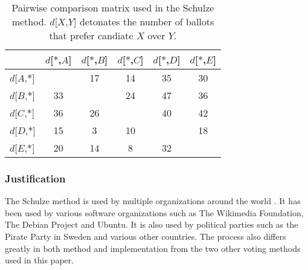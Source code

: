 \documentclass[12pt]{article}
\begin{document}
\begin{table}
\centering
\caption{Pairwise comparison matrix used in the Schulze method. $d$[$X$,$Y$] detonates the number of ballots that prefer candiate $X$ over $Y$.}
\begin{tabular}{l|c|c|c|c|c|}
\cline{2-6}
 & \multicolumn{1}{l|}{\small $d$[$*$,$A$]} & \multicolumn{1}{l|}{\small $d$[$*$,$B$]} & \multicolumn{1}{l|}{\small $d$[$*$,$C$]} & \multicolumn{1}{l|}{\small $d$[$*$,$D$]} & \multicolumn{1}{l|}{\small $d$[$*$,$E$]} \\ \hline
\multicolumn{1}{|l|}{\small $d$[$A$,$*$]} & \cellcolor[HTML]{9B9B9B} & \cellcolor[HTML]{FFDDDD}17 & \cellcolor[HTML]{FFDDDD}14 & \cellcolor[HTML]{DDFFDD}35 & \cellcolor[HTML]{DDFFDD}30 \\ \hline
\multicolumn{1}{|l|}{\small $d$[$B$,$*$]} & \cellcolor[HTML]{DDFFDD}33 & \cellcolor[HTML]{9B9B9B} & \cellcolor[HTML]{FFDDDD}24 & \cellcolor[HTML]{DDFFDD}47 & \cellcolor[HTML]{DDFFDD}36 \\ \hline
\multicolumn{1}{|l|}{\small $d$[$C$,$*$]} & \cellcolor[HTML]{DDFFDD}36 & \cellcolor[HTML]{DDFFDD}26 & \cellcolor[HTML]{9B9B9B} & \cellcolor[HTML]{DDFFDD}40 & \cellcolor[HTML]{DDFFDD}42 \\ \hline
\multicolumn{1}{|l|}{\small $d$[$D$,$*$]} & \cellcolor[HTML]{FFDDDD}15 & \cellcolor[HTML]{FFDDDD}3 & \cellcolor[HTML]{FFDDDD}10 & \cellcolor[HTML]{9B9B9B} & \cellcolor[HTML]{FFDDDD}18 \\ \hline
\multicolumn{1}{|l|}{\small $d$[$E$,$*$]} & \cellcolor[HTML]{FFDDDD}20 & \cellcolor[HTML]{FFDDDD}14 & \cellcolor[HTML]{FFDDDD}8 & \cellcolor[HTML]{DDFFDD}32 & \cellcolor[HTML]{9B9B9B} \\ \hline
\end{tabular}
\label{tab:pairwise comparison matrix}
\end{table}
\subsubsection{Justification}
The Schulze method is used by multiple organizations around the world \autocite{wikipedia2017schulze}. It has been used by various software organizations such as The Wikimedia Foundation, The Debian Project and Ubuntu. It is also used by political parties such as the Pirate Party in Sweden and various other countries. The process also differs greatly in both method and implementation from the two other voting methods used in this paper.
\end{document}
